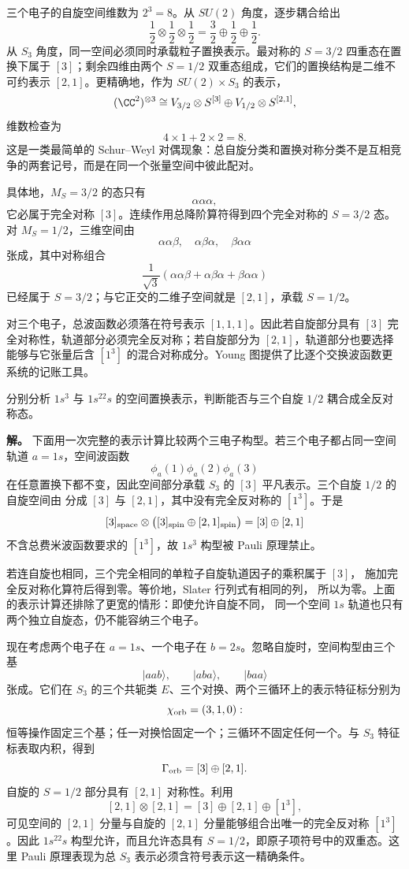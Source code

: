 三个电子的自旋空间维数为 $2^3=8$。从 $SU(2)$ 角度，逐步耦合给出
\[
\frac12\otimes\frac12\otimes\frac12
=\frac32\oplus\frac12\oplus\frac12.
\]
从 $S_3$ 角度，同一空间必须同时承载粒子置换表示。最对称的 $S=3/2$ 四重态在置换下属于 $[3]$；剩余四维由两个 $S=1/2$ 双重态组成，它们的置换结构是二维不可约表示 $[2,1]$。更精确地，作为 $SU(2)\times S_3$ 的表示，
\begin{equation}
(\CC^2)^{\otimes3}
\cong
V_{3/2}\otimes S^{[3]}
\oplus
V_{1/2}\otimes S^{[2,1]},
\label{eq:three-spin-schur-weyl}
\end{equation}
维数检查为
\[
4\times1+2\times2=8.
\]
这是一类最简单的 Schur--Weyl 对偶现象：总自旋分类和置换对称分类不是互相竞争的两套记号，而是在同一个张量空间中彼此配对。

具体地，$M_S=3/2$ 的态只有
\[
\alpha\alpha\alpha,
\]
它必属于完全对称 $[3]$。连续作用总降阶算符得到四个完全对称的 $S=3/2$ 态。对 $M_S=1/2$，三维空间由
\[
\alpha\alpha\beta,
\quad\alpha\beta\alpha,
\quad\beta\alpha\alpha
\]
张成，其中对称组合
\[
\frac1{\sqrt3}
(\alpha\alpha\beta+\alpha\beta\alpha+\beta\alpha\alpha)
\]
已经属于 $S=3/2$；与它正交的二维子空间就是 $[2,1]$，承载 $S=1/2$。

对三个电子，总波函数必须落在符号表示 $[1,1,1]$。因此若自旋部分具有 $[3]$ 完全对称性，轨道部分必须完全反对称；若自旋部分为 $[2,1]$，轨道部分也要选择能够与它张量后含 $[1^3]$ 的混合对称成分。Young 图提供了比逐个交换波函数更系统的记账工具。

\begin{example}
分别分析 $1s^3$ 与 $1s^22s$ 的空间置换表示，判断能否与三个自旋 $1/2$ 耦合成全反对称态。

\textbf{解。} 下面用一次完整的表示计算比较两个三电子构型。若三个电子都占同一空间轨道 $a=1s$，空间波函数
\[
\phi_a(1)\phi_a(2)\phi_a(3)
\]
在任意置换下都不变，因此空间部分承载 $S_3$ 的 $[3]$ 平凡表示。三个自旋 $1/2$ 的自旋空间由  分成 $[3]$ 与 $[2,1]$，其中没有完全反对称的 $[1^3]$。于是
\[
[3]_{\rm space}\otimes
\bigl([3]_{\rm spin}\oplus[2,1]_{\rm spin}\bigr)
=[3]\oplus[2,1]
\]
不含总费米波函数要求的 $[1^3]$，故 $1s^3$ 构型被 Pauli 原理禁止。

若连自旋也相同，三个完全相同的单粒子自旋轨道因子的乘积属于 $[3]$，
施加完全反对称化算符后得到零。等价地，Slater 行列式有相同的列，
所以为零。上面的表示计算还排除了更宽的情形：即使允许自旋不同，
同一个空间 $1s$ 轨道也只有两个独立自旋态，仍不能容纳三个电子。


现在考虑两个电子在 $a=1s$、一个电子在 $b=2s$。忽略自旋时，空间构型由三个基
\[
|aab\rangle,
\qquad |aba\rangle,
\qquad |baa\rangle
\]
张成。它们在 $S_3$ 的三个共轭类 $E$、三个对换、两个三循环上的表示特征标分别为
\[
\chi_{\rm orb}=(3,1,0):
\]
恒等操作固定三个基；任一对换恰固定一个；三循环不固定任何一个。与 $S_3$ 特征标表取内积，得到
\[
\Gamma_{\rm orb}=[3]\oplus[2,1].
\]
自旋的 $S=1/2$ 部分具有 $[2,1]$ 对称性。利用
\[
[2,1]\otimes[2,1]=[3]\oplus[2,1]\oplus[1^3],
\]
可见空间的 $[2,1]$ 分量与自旋的 $[2,1]$ 分量能够组合出唯一的完全反对称 $[1^3]$。因此 $1s^22s$ 构型允许，而且允许态具有 $S=1/2$，即原子项符号中的双重态。这里 Pauli 原理表现为总 $S_3$ 表示必须含符号表示这一精确条件。
\end{example}

